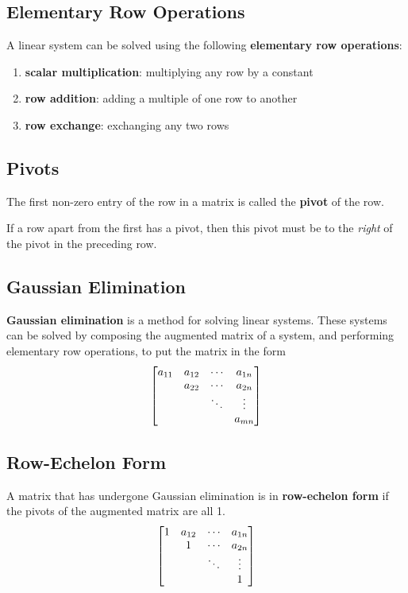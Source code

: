 \documentclass{article}
\begin{document}
	\subsection{Elementary Row Operations}
	\begin{definition}
		A linear system can be solved using the following \textbf{elementary row operations}:
		\begin{enumerate}
			\item \textbf{scalar multiplication}: multiplying any row by a constant
			\item \textbf{row addition}: adding a multiple of one row to another
			\item \textbf{row exchange}: exchanging any two rows
		\end{enumerate}
	\subsection{Pivots}
	\end{definition}
	\begin{definition}
		The first non-zero entry of the row in a matrix is called the \textbf{pivot} of the row.
	\end{definition}
	\begin{theorem} \label{theorem:pivots}
		If a row apart from the first has a pivot, then this pivot must be to the \textit{right} of the pivot in the preceding row.
	\end{theorem}
	\subsection{Gaussian Elimination}
	\begin{definition}
		\textbf{Gaussian elimination} is a method for solving linear systems. These systems can be solved by composing the augmented matrix of a system, and performing elementary row operations, to put the matrix in the form
		\begin{equation*}
			\mqty[
				a_{11} & a_{12} & \cdots & a_{1n} \\
				  	   & a_{22} & \cdots & a_{2n} \\
				  	   &        & \ddots & \vdots \\
				  	   &        &        & a_{mn}]
		\end{equation*}
	\end{definition}
	\subsection{Row-Echelon Form}
	\begin{definition}
		A matrix that has undergone Gaussian elimination is in \textbf{row-echelon form} if the pivots of the augmented matrix are all 1.
		\begin{equation*}
			\mqty[
				1 & a_{12} & \cdots & a_{1n} \\
				  & 1      & \cdots & a_{2n} \\
				  &        & \ddots & \vdots \\
				  &        &        & 1]
		\end{equation*}
	\end{definition}
\end{document}
